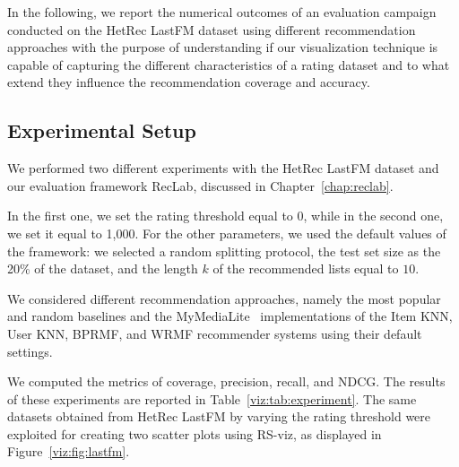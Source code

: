 In the following, we report the numerical outcomes of an evaluation campaign conducted on the HetRec LastFM dataset using different recommendation approaches with the purpose of understanding if our visualization technique is capable of capturing the different characteristics of a rating dataset and to what extend they influence the recommendation coverage and accuracy.

\subsection{Experimental Setup}

We performed two different experiments with the HetRec LastFM dataset and our evaluation framework RecLab, discussed in Chapter~\ref{chap:reclab}.

In the first one, we set the rating threshold equal to 0, while in the second one, we set it equal to 1,000. For the other parameters, we used the default values of the framework: we selected a random splitting protocol, the test set size as the 20\% of the dataset, and the length $k$ of the recommended lists equal to $10$.

We considered different recommendation approaches, namely the most popular and random baselines and the MyMediaLite~\cite{Gantner2011} implementations of the Item KNN, User KNN, BPRMF, and WRMF recommender systems using their default settings.

We computed the metrics of coverage, precision, recall, and NDCG. The results of these experiments are reported in Table~\ref{viz:tab:experiment}. The same datasets obtained from HetRec LastFM by varying the rating threshold were exploited for creating two scatter plots using RS-viz, as displayed in Figure~\ref{viz:fig:lastfm}.

